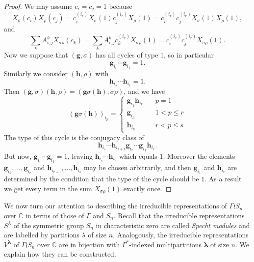 \documentclass[ALCO,Unicode]{cedram}
\newcommand{\bs}{\boldsymbol}
\begin{document}
\begin{proof}
We may assume $c_i = c_j = 1$ because
\[
X_\sigma(c_i) X_\rho(c_j) = c_i^{(i_r)} X_{\sigma}(1) c_j^{(i_r)} X_{\rho} (1) = c_i^{(i_r)}c_j^{(i_r)} X_\sigma(1) X_\rho(1),
\]
and
\[
\sum_{k} A_{i,j}^k X_{\sigma\rho}(c_k) = \sum_{k} A_{i,j}^k c_k^{(i_r)} X_{\sigma\rho}(1) = c_i^{(i_r)}c_j^{(i_r)} X_{\sigma\rho}(1).
\]
Now we suppose that $(\mathbf{g}, \sigma)$ has all cycles of type $1$, so in particular
\[
\mathbf{g}_{i_r} \cdots \mathbf{g}_{i_1} = 1.
\]
Similarly we consider $(\mathbf{h}, \rho)$ with
\[
\mathbf{h}_{i_s} \cdots \mathbf{h}_{i_r} = 1.
\]
Then $(\mathbf{g}, \sigma)(\mathbf{h}, \rho) = (\mathbf{g} \sigma(\mathbf{h}), \sigma\rho)$, and we have 
\[
(\mathbf{g} \sigma(\mathbf{h}))_{i_p} =
 \left\{
        \begin{array}{ll}
            \mathbf{g}_{i_1} \mathbf{h}_{i_r} & \quad p=1 \\
            \mathbf{g}_{i_p} & \quad 1 < p \leq r \\
            \mathbf{h}_{i_p} & \quad r < p \leq s
        \end{array}
    \right.
\]
The type of this cycle is the conjugacy class of
\[
\mathbf{h}_{i_s} \cdots \mathbf{h}_{i_{r+1}} \mathbf{g}_{i_r} \cdots \mathbf{g}_{i_1}\mathbf{h}_{i_r}.
\]
But now, $\mathbf{g}_{i_r} \cdots \mathbf{g}_{i_1} = 1$, leaving $\mathbf{h}_{i_s} \cdots \mathbf{h}_{i_r}$ which equals $1$. Moreover the elements $\mathbf{g}_{i_2}, \ldots, \mathbf{g}_{i_r}$ and $\mathbf{h}_{i_{r+1}}, \ldots, \mathbf{h}_{i_s}$ may be chosen arbitrarily, and then $\mathbf{g}_{i_1}$ and $\mathbf{h}_{i_r}$ are determined by the condition that the type of the cycle should be $1$. As a result we get every term in the sum $X_{\sigma\rho}(1)$ exactly once.
\end{proof}


We now turn our attention to describing the irreducible representations of $\Gamma \wr S_n$ over $\mathbb{C}$ in terms of those of $\Gamma$ and $S_n$. Recall that the irreducible representations $S^\lambda$ of the symmetric group $S_n$ in characteristic zero are called \emph{Specht modules} and are labelled by partitions $\lambda$ of size $n$. Analogously, the irreducible representations $V^{\bs\lambda}$ of $\Gamma \wr S_n$ over $\mathbb{C}$ are in bijection with $\Gamma^*$-indexed multipartitions $\bs\lambda$ of size $n$. We explain how they can be constructed.
\end{document}
